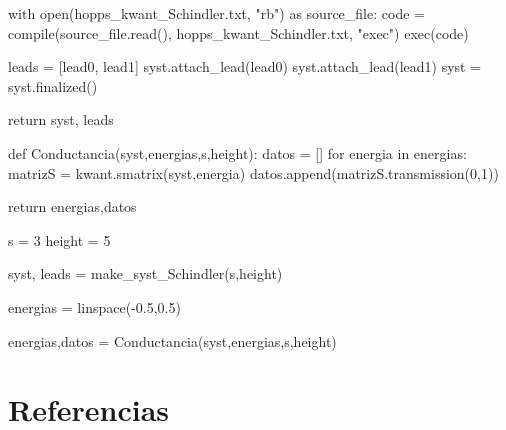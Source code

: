 \documentclass[
  letterpaper,
  DIV=11,
  numbers=noendperiod]{scrreprt}
\newenvironment{Shaded}{\begin{snugshade}}{\end{snugshade}}
\newcommand{\BuiltInTok}[1]{\textcolor[rgb]{0.00,0.23,0.31}{#1}}
\newcommand{\ControlFlowTok}[1]{\textcolor[rgb]{0.00,0.23,0.31}{#1}}
\newcommand{\DecValTok}[1]{\textcolor[rgb]{0.68,0.00,0.00}{#1}}
\newcommand{\FloatTok}[1]{\textcolor[rgb]{0.68,0.00,0.00}{#1}}
\newcommand{\ImportTok}[1]{\textcolor[rgb]{0.00,0.46,0.62}{#1}}
\newcommand{\KeywordTok}[1]{\textcolor[rgb]{0.00,0.23,0.31}{#1}}
\newcommand{\NormalTok}[1]{\textcolor[rgb]{0.00,0.23,0.31}{#1}}
\newcommand{\OperatorTok}[1]{\textcolor[rgb]{0.37,0.37,0.37}{#1}}
\newcommand{\StringTok}[1]{\textcolor[rgb]{0.13,0.47,0.30}{#1}}
\newlength{\cslhangindent}
\newlength{\cslentryspacingunit} %
\newenvironment{CSLReferences}[2] %
 {%
  \setlength{\parindent}{0pt}
  \ifodd #1
  \let\oldpar\par
  \def\par{\hangindent=\cslhangindent\oldpar}
  \fi
  \setlength{\parskip}{#2\cslentryspacingunit}
 }%
 {}
\begin{document}
\begin{Shaded}
\begin{Highlighting}[]
    \ControlFlowTok{with} \BuiltInTok{open}\NormalTok{(}\StringTok{\textquotesingle{}hopps\_kwant\_Schindler.txt\textquotesingle{}}\NormalTok{, }\StringTok{"rb"}\NormalTok{) }\ImportTok{as}\NormalTok{ source\_file:}
\NormalTok{        code }\OperatorTok{=} \BuiltInTok{compile}\NormalTok{(source\_file.read(), }\StringTok{\textquotesingle{}hopps\_kwant\_Schindler.txt\textquotesingle{}}\NormalTok{, }\StringTok{"exec"}\NormalTok{)}
        \BuiltInTok{exec}\NormalTok{(code)}
    
\NormalTok{    leads }\OperatorTok{=}\NormalTok{ [lead0, lead1]   }
\NormalTok{    syst.attach\_lead(lead0)   }
\NormalTok{    syst.attach\_lead(lead1)   }
\NormalTok{    syst }\OperatorTok{=}\NormalTok{ syst.finalized() }
    
    \ControlFlowTok{return}\NormalTok{ syst, leads    }
\end{Highlighting}
\end{Shaded}

\begin{Shaded}
\begin{Highlighting}[]
\KeywordTok{def}\NormalTok{ Conductancia(syst,energias,s,height):}
\NormalTok{  datos }\OperatorTok{=}\NormalTok{ []}
  \ControlFlowTok{for}\NormalTok{ energia }\KeywordTok{in}\NormalTok{ energias:}
\NormalTok{    matrizS }\OperatorTok{=}\NormalTok{ kwant.smatrix(syst,energia)}
\NormalTok{    datos.append(matrizS.transmission(}\DecValTok{0}\NormalTok{,}\DecValTok{1}\NormalTok{))}
  
  \ControlFlowTok{return}\NormalTok{ energias,datos}
\end{Highlighting}
\end{Shaded}

\begin{Shaded}
\begin{Highlighting}[]
\NormalTok{s }\OperatorTok{=} \DecValTok{3}
\NormalTok{height }\OperatorTok{=} \DecValTok{5}

\NormalTok{syst, leads }\OperatorTok{=}\NormalTok{ make\_syst\_Schindler(s,height)}

\NormalTok{energias }\OperatorTok{=}\NormalTok{ linspace(}\OperatorTok{{-}}\FloatTok{0.5}\NormalTok{,}\FloatTok{0.5}\NormalTok{)}

\NormalTok{energias,datos }\OperatorTok{=}\NormalTok{ Conductancia(syst,energias,s,height)}
\end{Highlighting}
\end{Shaded}


\hypertarget{referencias}{%
\chapter*{Referencias}\label{referencias}}

\hypertarget{refs}{}
\begin{CSLReferences}{0}{0}
\end{CSLReferences}
\end{document}
